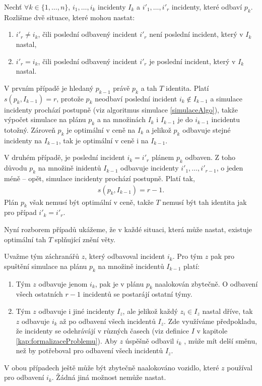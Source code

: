 \begin{dukaz}
  Nechť $\forall k \in \{ 1, \dots, n\}$, $i_1, \dots, i_k$ incidenty $I_k$ a $i'_1, \dots, i'_r$ incidenty, které odbaví $p_k$.
  Rozlišme dvě situace, které mohou nastat:
  \begin{enumerate}
    \item
      $i'_r \neq i_k$,
      čili poslední odbavený incident $i'_r$ není poslední incident, který v $I_k$ nastal,

    \item
      $i'_r = i_k$, čili poslední odbavený incident $i'_r$ je poslední incident, který v $I_k$ nastal.
  \end{enumerate}
  V prvním případě je hledaný $p_{k-1}$ právě $p_k$ a tah $T$ identita.
  Platí $s(p_k, I_{k-1}) = r$, protože $p_k$ neodbaví poslední incident $i_k \not \in I_{k-1}$ a simulace incidenty prochází postupně (viz algoritmus simulace \ref{simulaceAlgo}),
  takže výpočet simulace na plánu $p_{k}$ a na množinách $I_k$ i $I_{k-1}$ je do $i_{k-1}$ incidentu totožný.
  Zároveň $p_k$ je optimální v ceně na $I_k$ a jelikož $p_k$ odbavuje stejné incidenty na $I_{k-1}$, tak je optimální v ceně i na $I_{k-1}$.

  V druhém případě, je poslední incident $i_k = i'_r$ plánem $p_k$ odbaven.
  Z toho důvodu $p_k$ na množině inidentů $I_{k-1}$ odbavuje incidenty $i'_1, \dots, i'_{r-1}$, o jeden méně -- opět, simulace incidenty prochází postupně.
  Platí tak,
  \begin{align*}
    s(p_k, I_{k-1}) = r - 1.
  \end{align*}
  Plán $p_k$ však nemusí být optimální v ceně, takže $T$ nemusí být tah identita jak pro případ $i'_k = i'_r$. 

  Nyní rozborem případů ukážeme, že v každé situaci, která může nastat, existuje optimální tah $T$ splňující znění věty.

  Uvažme tým záchranářů $z$, který odbavoval incident $i_k$.
  Pro tým $z$ pak pro spuštění simulace na plánu $p_k$ na množině incidentů $I_{k-1}$ platí:
  \begin{enumerate}
    \item
      Tým $z$ odbavuje jenom $i_k$, pak je v plánu $p_k$ naalokován zbytečně. O odbavení všech ostatních $r-1$ incidentů se postarájí ostatní týmy.

    \item
      Tým $z$ odbavuje i jiné incidenty $I_z$, ale jelikož každý $z_i \in I_z$ nastal dříve,
      tak $z$ odbavuje $i_k$ až po odbavení všech incidentů $I_z$.
      Zde využíváme předpokladu, že incidenty se odehrávájí v různých časech (viz definice $I$ v kapitole \ref{kap:formalizaceProblemu}).
      Aby $z$ úspěšně odbavil $i_k$ , může mít delší směnu, než by potřeboval pro odbavení všech incidentů $I_z$.
  \end{enumerate}
  V obou případech ještě může být zbytečně naalokováno vozidlo, které $z$ používal pro odbavení $i_k$.
  Žádná jiná možnost nemůže nastat.


\end{dukaz}
